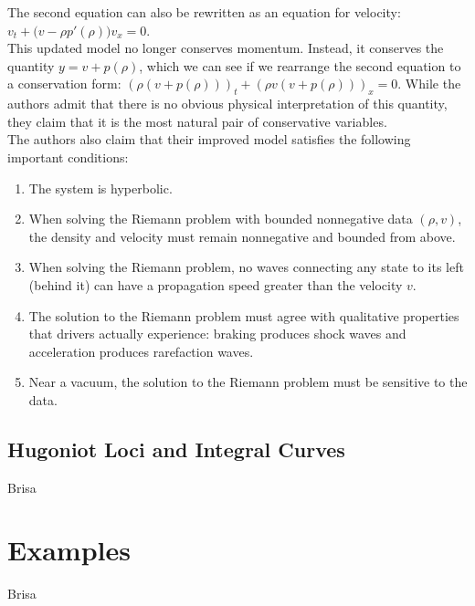 \documentclass{article}
\begin{document}
The second equation can also be rewritten as an equation for velocity: $v_t + \Big(v - \rho p'(\rho)\Big)v_x = 0$. \\

This updated model no longer conserves momentum.  Instead, it conserves the quantity $y = v + p(\rho)$, which we can see if we rearrange the second equation to a conservation form: $(\rho (v + p(\rho)))_t + (\rho v(v + p(\rho)))_x = 0$. While the authors admit that there is no obvious physical interpretation of this quantity, they claim that it is the most natural pair of conservative variables. \\

The authors also claim that their improved model satisfies the following important conditions:
\begin{enumerate}
\item The system is hyperbolic.
\item When solving the Riemann problem with bounded nonnegative data $(\rho, v)$, the density and velocity must remain nonnegative and bounded from above.
\item When solving the Riemann problem, no waves connecting any state to its left (behind it) can have a propagation speed greater than the velocity $v$.
\item The solution to the Riemann problem must agree with qualitative properties that drivers actually experience: braking produces shock waves and acceleration produces rarefaction waves.
\item Near a vacuum, the solution to the Riemann problem must be sensitive to the data.
\end{enumerate}


\subsection{Hugoniot Loci and Integral Curves}
Brisa

\section{Examples}
Brisa
\end{document}
